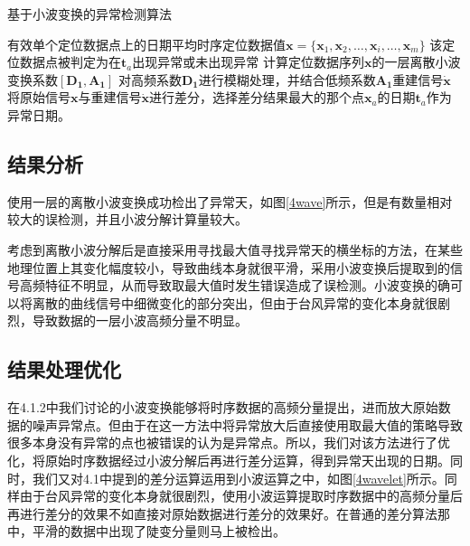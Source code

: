 \documentclass[a4paper,AutoFakeBold,oneside,12pt]{book}
\begin{document}
\begin{algorithm} 
\caption{基于小波变换的异常检测算法} 
\label{a43}
\renewcommand{\algorithmicrequire}{\textbf{输入：}}
\renewcommand{\algorithmicensure}{\textbf{输出：}} 
\begin{algorithmic}[1] 
\Require 有效单个定位数据点上的日期平均时序定位数据值$\bm{x}=\{\bm{x}_1,\bm{x}_2,\ldots,\bm{x}_i,\ldots,\bm{x}_m\}$
\Ensure 该定位数据点被判定为在$\bm{t}_a$出现异常或未出现异常
\State  计算定位数据序列$\bm{x}$的一层离散小波变换系数$[\bm{D_1},\bm{A_1}]$
\State  对高频系数$\bm{D_1}$进行模糊处理，并结合低频系数$\bm{A_1}$重建信号$\bm{\dot{x}}$
\State 将原始信号$\bm{x}$与重建信号$\bm{\dot{x}}$进行差分，选择差分结果最大的那个点$\bm{x}_a$的日期$\bm{t}_a$作为异常日期。
\end{algorithmic}  
\end{algorithm}

\subsection{结果分析}
	使用一层的离散小波变换成功检出了异常天，如图\ref{4wave}所示，但是有数量相对较大的误检测，并且小波分解计算量较大。


	考虑到离散小波分解后是直接采用寻找最大值寻找异常天的横坐标的方法，在某些地理位置上其变化幅度较小，导致曲线本身就很平滑，采用小波变换后提取到的信号高频特征不明显，从而导致取最大值时发生错误造成了误检测。小波变换的确可以将离散的曲线信号中细微变化的部分突出，但由于台风异常的变化本身就很剧烈，导致数据的一层小波高频分量不明显。

\subsection{结果处理优化}
	在4.1.2中我们讨论的小波变换能够将时序数据的高频分量提出，进而放大原始数据的噪声异常点。但由于在这一方法中将异常放大后直接使用取最大值的策略导致很多本身没有异常的点也被错误的认为是异常点。所以，我们对该方法进行了优化，将原始时序数据经过小波分解后再进行差分运算，得到异常天出现的日期。同时，我们又对4.1中提到的差分运算运用到小波运算之中，如图\ref{4wavelet}所示。同样由于台风异常的变化本身就很剧烈，使用小波运算提取时序数据中的高频分量后再进行差分的效果不如直接对原始数据进行差分的效果好。在普通的差分算法那中，平滑的数据中出现了陡变分量则马上被检出。

\end{document}
